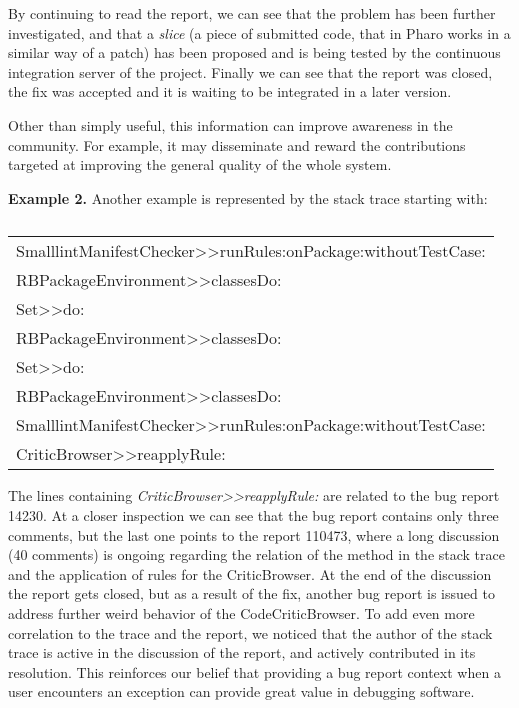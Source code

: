 By continuing to read the report, we can see that the problem has been further investigated, and that a \emph{slice} (a piece of submitted code, that in Pharo works in a similar way of a patch) has been proposed and is being tested by the continuous integration server of the project. Finally we can see that the report was closed, the fix was accepted and it is waiting to be integrated in a later version. 

Other than simply useful, this information can improve awareness in the community. For example, it may disseminate and reward the contributions targeted at improving the general quality of the whole system. 

{\bf Example 2.} Another example is represented by the stack trace starting with:

\begin{table}[h]
\centering
\caption{}
{\footnotesize
\begin{tabular}{l}
SmalllintManifestChecker>>runRules:onPackage:withoutTestCase: \\
RBPackageEnvironment>>classesDo: \\
Set>>do: \\
RBPackageEnvironment>>classesDo: \\
Set>>do: \\
RBPackageEnvironment>>classesDo: \\
SmalllintManifestChecker>>runRules:onPackage:withoutTestCase: \\
CriticBrowser>>reapplyRule:
\end{tabular}}
\end{table}

The lines containing \emph{CriticBrowser{>}{>}reapplyRule:} are related to the bug report 14230. At a closer inspection we can see that the bug report contains only three comments, but the last one points to the report 110473, where a long discussion (40 comments) is ongoing regarding the relation of the method in the stack trace and the application of rules for the CriticBrowser. At the end of the discussion the report gets closed, but as a result of the fix, another bug report is issued to address further weird behavior of the CodeCriticBrowser. To add even more correlation to the trace and the report, we noticed that the author of the stack trace is active in the discussion of the report, and actively contributed in its resolution. This reinforces our belief that providing a bug report context when a user encounters an exception can provide great value in debugging software.




